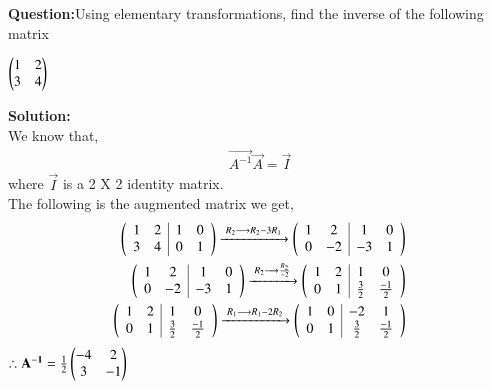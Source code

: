 \documentclass[journal,onecolumn]{IEEEtran}
\begin{document}
\textbf{Question:}Using elementary transformations, find the inverse of the following matrix\\
\begin{center}
    $\begin{pmatrix}1&2\\3&4\end{pmatrix}$
\end{center}
\textbf{Solution:}\\
We know that,\\
\begin{align}
    \vec{A^{-1}}\vec{A}=\vec{I}
\end{align}
    where $\vec{I}$ is a 2 X 2 identity matrix.\\
    The following is the augmented matrix we get,
\begin{align}
  \begin{pmatrix}
    \begin{array}{cc|cc}
      1 & 2 & 1 & 0 \\ 
      3 & 4 & 0 & 1
    \end{array}
  \end{pmatrix}
  \xrightarrow{\;R_2\longrightarrow R_2-3R_1\;}   \begin{pmatrix}
    \begin{array}{cc|cc}
      1 & 2 & 1 & 0 \\ 
      0 & -2 & -3 & 1
    \end{array}
  \end{pmatrix}\\
  \begin{pmatrix}
    \begin{array}{cc|cc}
      1 & 2 & 1 & 0 \\ 
      0 & -2 & -3 & 1
    \end{array}
  \end{pmatrix}\xrightarrow{\;R_2\longrightarrow \frac{R_2}{-2}\;} 
  \begin{pmatrix}
    \begin{array}{cc|cc}
      1 & 2 & 1 & 0 \\ 
      0 & 1 & \frac{3}{2} & \frac{-1}{2}
    \end{array}
  \end{pmatrix}\\
   \begin{pmatrix}\begin{array}{cc|cc}
      1 & 2 & 1 & 0 \\ 
      0 & 1 & \frac{3}{2} & \frac{-1}{2}
    \end{array}
  \end{pmatrix}\xrightarrow{\;R_1\longrightarrow R_1-2R_2\;}   \begin{pmatrix}\begin{array}{cc|cc}
      1 & 0 & -2 & 1 \\ 
      0 & 1 & \frac{3}{2} & \frac{-1}{2}
 \end{array}\end{pmatrix}
\end{align}
\centering
    $\therefore \mathbf{A^{-1}}=\frac{1}{2}\begin{pmatrix}-4 & 2\\3 & -1\end{pmatrix}$
\end{document}
